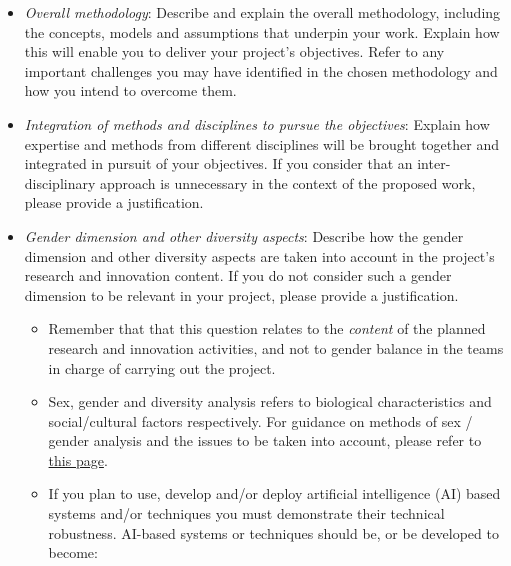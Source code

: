 \documentclass[11pt,draftproposal]{msca-pf}
\begin{document}
\begin{itemize}
    \item \emph{Overall methodology}: Describe and explain the overall methodology,
    including the concepts, models and assumptions that underpin your work.
    Explain how this will enable you to deliver your project’s objectives. Refer
    to any important challenges you may have identified in the chosen methodology
    and how you intend to overcome them.

    \item \emph{Integration of methods and disciplines to pursue the objectives}:
    Explain how expertise and methods from different disciplines will be brought
    together and integrated in pursuit of your objectives. If you consider that
    an inter-disciplinary\footnotemark{} approach is unnecessary in the
    context of the proposed work, please provide a justification.


    \item \emph{Gender dimension and other diversity aspects}: Describe how the
    gender dimension and other diversity aspects are taken into account in the
    project's research and innovation content. If you do not consider such a
    gender dimension to be relevant in your project, please provide a
    justification.
    \begin{itemize}
        \item Remember that that this question relates to the \emph{content} of the
        planned research and innovation activities, and not to gender balance
        in the teams in charge of carrying out the project.

        \item  Sex, gender and diversity analysis refers to biological
        characteristics and social/cultural factors respectively. For guidance on
        methods of sex / gender analysis and the issues to be taken into account,
        please refer to
        \href{https://ec.europa.eu/info/news/gendered-innovations-2-2020-nov-24_en}{this page}.

        \item If you plan to use, develop and/or deploy artificial intelligence
        (AI) based systems and/or techniques you must demonstrate their technical
        robustness. AI-based systems or techniques should be, or be developed to
        become:


\end{itemize}
\end{itemize}
\end{document}
